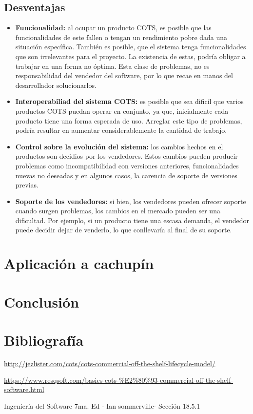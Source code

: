\documentclass{udpreport}
\begin{document}
	\section{Desventajas}
	\begin{itemize}
	\item \textbf{Funcionalidad:} al ocupar un producto COTS, es posible que las funcionalidades de este fallen o tengan un rendimiento pobre dada una situación específica. También es posible, que el sistema tenga funcionalidades que son irrelevantes para el proyecto. La existencia de estas, podría obligar a trabajar en una forma no óptima. Esta clase de problemas, no es responsabilidad del vendedor del software, por lo que recae en manos del desarrollador solucionarlos.
	
	\item \textbf{Interoperabiliad del sistema COTS:} es posible que sea dificil que varios productos COTS puedan operar en conjunto, ya que, inicialmente cada producto tiene una forma esperada de uso. Arreglar este tipo de problemas, podría resultar en aumentar considerablemente la cantidad de trabajo.
	
	\item \textbf{Control sobre la evolución del sistema:} los cambios hechos en el productos son decidios por los vendedores. Estos cambios pueden producir problemas como incompatibilidad con versiones anteriores, funcionalidades nuevas no deseadas y en algunos casos, la carencia de soporte de versiones previas. 
	
	\item \textbf{Soporte de los vendedores:} si bien, los vendedores pueden ofrecer soporte cuando surgen problemas, los cambios en el mercado pueden ser una dificultad. Por ejemplo, si un producto tiene una escasa demanda, el vendedor puede decidir dejar de venderlo, lo que conllevaría al final de su soporte. 
	\end{itemize}

\chapter{Aplicación a cachupín}

\chapter{Conclusión}
\chapter{Bibliografía}
\url{http://jezlister.com/cots/cots-commercial-off-the-shelf-lifecycle-model/}


\url{https://www.resqsoft.com/basics-cots-%E2%80%93-commercial-off-the-shelf-software.html}

Ingeniería del Software 7ma. Ed - Ian sommerville- Sección 18.5.1
\end{document}
